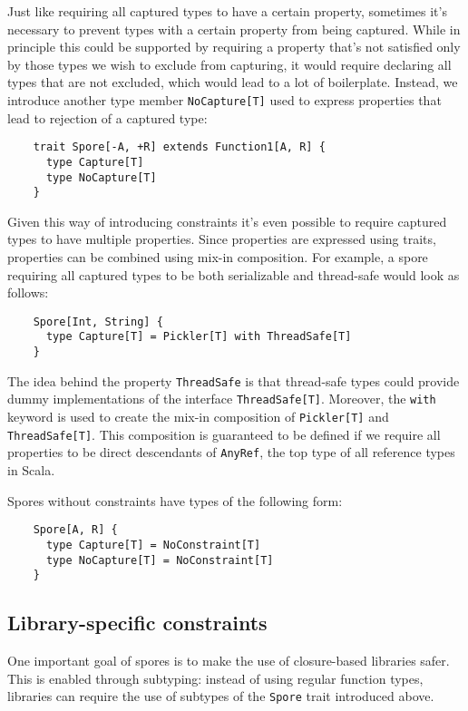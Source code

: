 \documentclass{llncs}
\begin{document}
Just like requiring all captured types to have a certain property, sometimes
it's necessary to prevent types with a certain property from being captured.
While in principle this could be supported by requiring a property that's not
satisfied only by those types we wish to exclude from capturing, it would
require declaring all types that are not excluded, which would lead to a lot
of boilerplate. Instead, we introduce another type member \verb|NoCapture[T]|
used to express properties that lead to rejection of a captured type:

\begin{lstlisting}
    trait Spore[-A, +R] extends Function1[A, R] {
      type Capture[T]
      type NoCapture[T]
    }
\end{lstlisting}
\noindent
Given this way of introducing constraints it's even possible to require
captured types to have multiple properties. Since properties are expressed
using traits, properties can be combined using mix-in composition. For
example, a spore requiring all captured types to be both serializable and
thread-safe would look as follows:

\begin{lstlisting}
    Spore[Int, String] {
      type Capture[T] = Pickler[T] with ThreadSafe[T]
    }
\end{lstlisting}
\noindent
The idea behind the property \verb|ThreadSafe| is that thread-safe types could
provide dummy implementations of the interface \verb|ThreadSafe[T]|. Moreover,
the \verb|with| keyword is used to create the mix-in composition of
\verb|Pickler[T]| and \verb|ThreadSafe[T]|. This composition is guaranteed to
be defined if we require all properties to be direct descendants of
\verb|AnyRef|, the top type of all reference types in Scala.

Spores without constraints have types of the following form:
\begin{lstlisting}
    Spore[A, R] {
      type Capture[T] = NoConstraint[T]
      type NoCapture[T] = NoConstraint[T]
    }
\end{lstlisting}

\subsection{Library-specific constraints}

One important goal of spores is to make the use of closure-based libraries
safer. This is enabled through subtyping: instead of using regular function
types, libraries can require the use of subtypes of the \verb|Spore| trait
introduced above.
\end{document}
